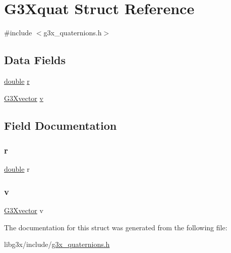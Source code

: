 \hypertarget{struct_g3_xquat}{}\section{G3\+Xquat Struct Reference}
\label{struct_g3_xquat}


{\ttfamily \#include $<$g3x\+\_\+quaternions.\+h$>$}

\subsection*{Data Fields}
\begin{DoxyCompactItemize}
\item 
\hyperlink{g3x__transfo_8h_a89b2b23e407882a535d835574a7912e1}{double} \hyperlink{struct_g3_xquat_a880a49112fedae68e714341a9a082fb6}{r}
\item 
\hyperlink{g3x__types_8h_a6181ad7c7bac1d7942ab3944bae2b8a1}{G3\+Xvector} \hyperlink{struct_g3_xquat_a26230cbe52f1aebedaea5628686a643b}{v}
\end{DoxyCompactItemize}


\subsection{Field Documentation}
\mbox{\label{struct_g3_xquat_a880a49112fedae68e714341a9a082fb6}} 
\subsubsection{\texorpdfstring{r}{r}}
{\footnotesize\ttfamily \hyperlink{g3x__transfo_8h_a89b2b23e407882a535d835574a7912e1}{double} r}

\mbox{\label{struct_g3_xquat_a26230cbe52f1aebedaea5628686a643b}} 
\subsubsection{\texorpdfstring{v}{v}}
{\footnotesize\ttfamily \hyperlink{g3x__types_8h_a6181ad7c7bac1d7942ab3944bae2b8a1}{G3\+Xvector} v}



The documentation for this struct was generated from the following file\+:\begin{DoxyCompactItemize}
\item 
libg3x/include/\hyperlink{g3x__quaternions_8h}{g3x\+\_\+quaternions.\+h}\end{DoxyCompactItemize}
